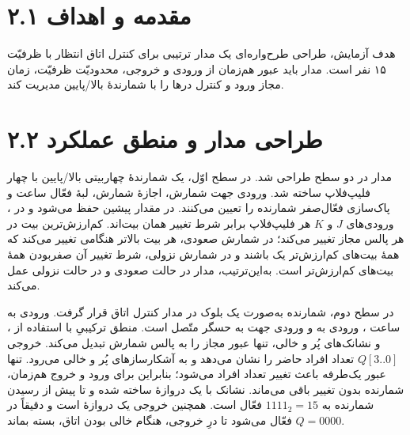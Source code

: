 \documentclass[12pt,a4paper]{article}
\begin{document}

	\section*{۲.۱ مقدمه و اهداف}
	هدف آزمایش، طراحی طرح‌واره‌ای یک مدار ترتیبی برای کنترل اتاق انتظار با ظرفیّت ۱۵ نفر است. مدار باید عبور هم‌زمان از ورودی و خروجی، محدودیّت ظرفیّت، زمان مجاز ورود و کنترل درها را با شمارندهٔ بالا/پایین مدیریت کند.

	\section*{۲.۲ طراحی مدار و منطق عملکرد}
	مدار در دو سطح طراحی شد. در سطح اوّل، یک شمارندهٔ چهاربیتی بالا/پایین با چهار فلیپ‌فلاپ  ساخته شد. ورودی  جهت شمارش،  اجازهٔ شمارش،  لبهٔ فعّال ساعت و  پاک‌سازی فعّال‌صفر شمارنده را تعیین می‌کنند. در  مقدار پیشین حفظ می‌شود و در ، ورودی‌های \(J\) و \(K\) هر فلیپ‌فلاپ برابر شرط تغییر همان بیت‌اند. کم‌ارزش‌ترین بیت در هر پالس مجاز تغییر می‌کند؛ در شمارش صعودی، هر بیت بالاتر هنگامی تغییر می‌کند که همهٔ بیت‌های کم‌ارزش‌تر یک باشند و در شمارش نزولی، شرط تغییر آن صفر‌بودن همهٔ بیت‌های کم‌ارزش‌تر است. به‌این‌ترتیب، مدار در حالت  صعودی و در حالت  نزولی عمل می‌کند.


	در سطح دوم، شمارنده به‌صورت یک بلوک در مدار کنترل اتاق قرار گرفت. ورودی  به ساعت ، ورودی  به  و ورودی جهت  به حسگر  متّصل است. منطق ترکیبیِ  با استفاده از ،  و نشانک‌های پُر و خالی، تنها عبور مجاز را به پالس شمارش تبدیل می‌کند. خروجی \(Q[3..0]\) تعداد افراد حاضر را نشان می‌دهد و به آشکارسازهای پُر و خالی می‌رود. تنها عبور یک‌طرفه باعث تغییر تعداد افراد می‌شود؛ بنابراین برای ورود و خروج هم‌زمان، شمارنده بدون تغییر باقی می‌ماند. نشانک  با یک دروازهٔ  ساخته شده و تا پیش از رسیدن شمارنده به \(1111_2=15\) فعّال است. همچنین  خروجی یک دروازهٔ  است و دقیقاً در \(Q=0000\) فعّال می‌شود تا درِ خروجی، هنگام خالی بودن اتاق، بسته بماند.
\end{document}
